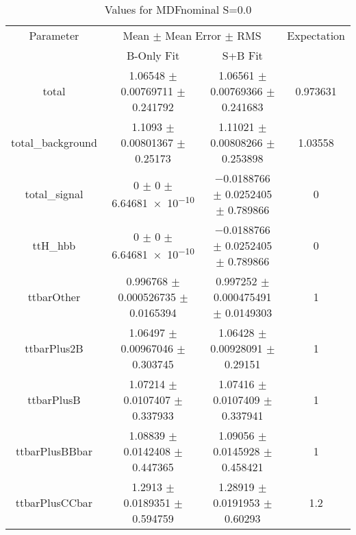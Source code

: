 \begin{table}
\centering
\caption{Values for MDFnominal S=0.0}
\begin{tabular}{cccc}
\toprule
Parameter & \multicolumn{2}{c}{Mean $\pm$ Mean Error $\pm$ RMS} & Expectation\\
 & B-Only Fit & S+B Fit & \\
\midrule
total & \num{1.06548} $\pm$ \num{0.00769711} $\pm$ \num{0.241792} & \num{1.06561} $\pm$ \num{0.00769366} $\pm$ \num{0.241683} & \num{0.973631}\\
total\_background & \num{1.1093} $\pm$ \num{0.00801367} $\pm$ \num{0.25173} & \num{1.11021} $\pm$ \num{0.00808266} $\pm$ \num{0.253898} & \num{1.03558}\\
total\_signal & \num{0} $\pm$ \num{0} $\pm$ \num{6.64681e-10} & \num{-0.0188766} $\pm$ \num{0.0252405} $\pm$ \num{0.789866} & \num{0}\\
ttH\_hbb & \num{0} $\pm$ \num{0} $\pm$ \num{6.64681e-10} & \num{-0.0188766} $\pm$ \num{0.0252405} $\pm$ \num{0.789866} & \num{0}\\
ttbarOther & \num{0.996768} $\pm$ \num{0.000526735} $\pm$ \num{0.0165394} & \num{0.997252} $\pm$ \num{0.000475491} $\pm$ \num{0.0149303} & \num{1}\\
ttbarPlus2B & \num{1.06497} $\pm$ \num{0.00967046} $\pm$ \num{0.303745} & \num{1.06428} $\pm$ \num{0.00928091} $\pm$ \num{0.29151} & \num{1}\\
ttbarPlusB & \num{1.07214} $\pm$ \num{0.0107407} $\pm$ \num{0.337933} & \num{1.07416} $\pm$ \num{0.0107409} $\pm$ \num{0.337941} & \num{1}\\
ttbarPlusBBbar & \num{1.08839} $\pm$ \num{0.0142408} $\pm$ \num{0.447365} & \num{1.09056} $\pm$ \num{0.0145928} $\pm$ \num{0.458421} & \num{1}\\
ttbarPlusCCbar & \num{1.2913} $\pm$ \num{0.0189351} $\pm$ \num{0.594759} & \num{1.28919} $\pm$ \num{0.0191953} $\pm$ \num{0.60293} & \num{1.2}\\
\bottomrule
\end{tabular}
\end{table}